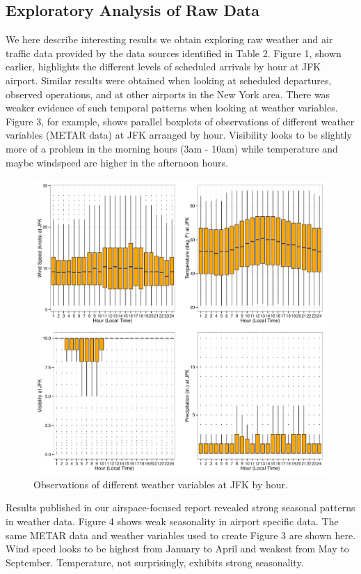 \documentclass[11pt]{scrartcl}
\begin{document}
\subsection{Exploratory Analysis of Raw Data}
We here describe interesting results we obtain exploring raw weather and air traffic data provided by the data sources identified in Table 2.  Figure 1, shown earlier, highlights the different levels of scheduled arrivals by hour at JFK airport.  Similar results were obtained when looking at scheduled departures, observed operations, and at other airports in the New York area.  There was weaker evidence of such temporal patterns when looking at weather variables.  Figure 3, for example, shows parallel boxplots of observations of different weather variables (METAR data) at JFK arranged by hour.  Visibility looks to be slightly more of a problem in the morning hours (3am - 10am) while temperature and maybe windspeed are higher in the afternoon hours.
\begin{figure}[h]
\begin{center}
\includegraphics[scale=0.60]{./figures/Fig3.pdf}
\caption{Observations of different weather variables at JFK by hour.}
\label{default}
\end{center}
\end{figure}
\newpage\noindent
Results published in our airspace-focused report revealed strong seasonal patterns in weather data.  Figure 4 shows weak seasonality in airport specific data.  The same METAR data and weather variables used to create Figure 3 are shown here.  Wind speed looks to be highest from January to April and weakest from May to September.  Temperature, not surprisingly, exhibits strong seasonality.
\end{document}
